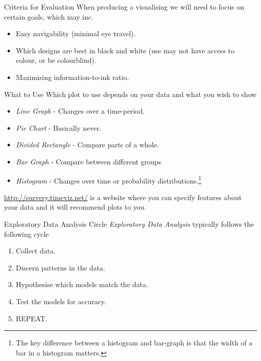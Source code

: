 \documentclass[11pt,a4paper]{article}
\begin{document}
  \begin{remark}{Criteria for Evaluation}
    When producing a visualising we will need to focus on certain goals, which may inc.
    \begin{itemize}
      \item Easy navigability (minimal eye travel).
      \item Which designs are best in black and white (use may not have access to colour, or be colourblind).
      \item Maximising information-to-ink ratio.
    \end{itemize}
  \end{remark}

  \begin{remark}{What to Use}
    Which plot to use depends on your data and what you wish to show
    \begin{itemize}
      \item \textit{Line Graph} - Changes over a time-period.
      \item \textit{Pie Chart} - Basically never.
      \item \textit{Divided Rectangle} - Compare parts of a whole.
      \item \textit{Bar Graph} - Compare between different groups
      \item \textit{Histogram} - Changes over time or probability distributions.\footnote{The key difference between a histogram and bar-graph is that the width of a bar in a histogram matters.}
    \end{itemize}
    \url{http://survery.timeviz.net/} is a website where you can specify features about your data and it will recommend plots to you.
  \end{remark}

  \begin{proposition}{Exploratory Data Analysis Circle}
    \textit{Exploratory Data Analysis} typically follows the following cycle
    \begin{enumerate}
      \item Collect data.
      \item Discern patterns in the data.
      \item Hypothesise which models match the data.
      \item Test the models for accuracy.
      \item REPEAT.
    \end{enumerate}
  \end{proposition}
\end{document}
